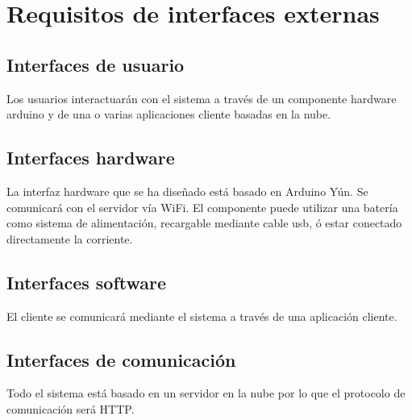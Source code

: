 \section{Requisitos de interfaces externas}

\subsection{Interfaces de usuario}

Los usuarios interactuarán con el sistema a través de un componente hardware arduino y de una o varias aplicaciones cliente basadas en la nube.

\subsection{Interfaces hardware}

La interfaz hardware que se ha diseñado está basado en Arduino Yún. Se comunicará con el servidor vía WiFi. El componente puede utilizar una batería como sistema de alimentación, recargable mediante cable usb, ó estar conectado directamente la corriente.

\subsection{Interfaces software}

El cliente se comunicará mediante el sistema a través de una aplicación cliente.

\subsection{Interfaces de comunicación}

Todo el sistema está basado en un servidor en la nube por lo que el protocolo de comunicación será HTTP.